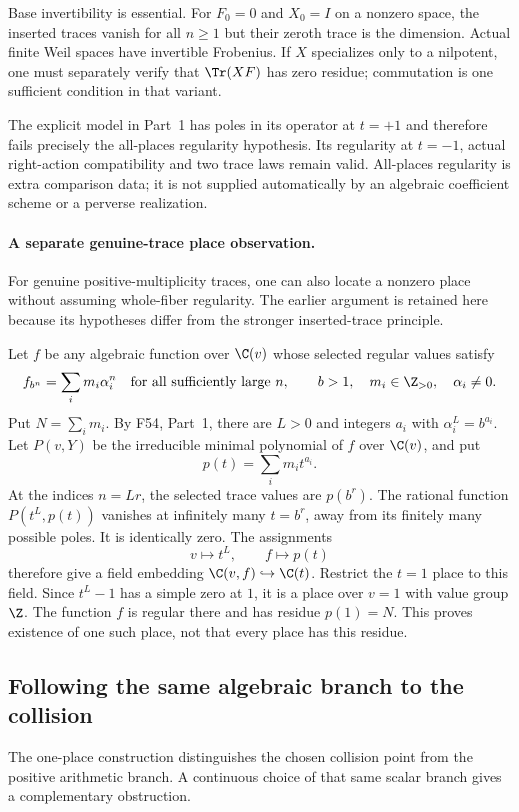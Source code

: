 \documentclass[11pt,a4paper]{article}
\newcommand{\fid}[1]{\textsf{#1}}\newcommand{\gate}[1]{\textsf{#1}}
\theoremstyle{named}\newtheorem{finding}{Finding}[section]
\theoremstyle{definition}\newtheorem{definition}[finding]{Definition}
\theoremstyle{remark}\newtheorem{remark}[finding]{Remark}
\begin{document}
Base invertibility is essential.
For $F_0=0$ and $X_0=I$ on a nonzero space,
the inserted traces vanish for all $n\ge1$ but their
zeroth trace is the dimension.
Actual finite Weil spaces have invertible Frobenius.
If $X$ specializes only to a nilpotent, one must
separately verify that $\Tr(XF)$ has zero residue;
commutation is one sufficient condition in that variant.

The explicit model in Part~1 has poles in its operator
at $t=+1$ and therefore fails precisely the all-places
regularity hypothesis.
Its regularity at $t=-1$, actual right-action
compatibility and two trace laws remain valid.
All-places regularity is extra comparison data;
it is not supplied automatically by an algebraic
coefficient scheme or a perverse realization.
\paragraph{A separate genuine-trace place observation.}
For genuine positive-multiplicity traces, one can also locate a nonzero place without assuming whole-fiber regularity. The earlier argument is retained here because its hypotheses differ from the stronger inserted-trace principle.

Let $f$ be any algebraic function over $\C(v)$
whose selected regular values satisfy
\[
 f_{b^n}=\sum_i m_i\alpha_i^n
 \quad\text{for all sufficiently large }n,\qquad
 b>1,\quad m_i\in\Z_{>0},\quad\alpha_i\ne0.
\]
Put $N=\sum_i m_i$.
By \fid{F54}, Part~1, there are $L>0$ and integers
$a_i$ with $\alpha_i^L=b^{a_i}$.
Let $P(v,Y)$ be the irreducible minimal polynomial of
$f$ over $\C(v)$, and put
\[
 p(t)=\sum_i m_i t^{a_i}.
\]
At the indices $n=Lr$, the selected trace values
are $p(b^r)$. The rational function $P(t^L,p(t))$
vanishes at infinitely many $t=b^r$, away from its
finitely many possible poles. It is identically zero.
The assignments
\[
 v\longmapsto t^L,\qquad f\longmapsto p(t)
\]
therefore give a field embedding
$\C(v,f)\hookrightarrow\C(t)$.
Restrict the $t=1$ place to this field.
Since $t^L-1$ has a simple zero at $1$, it is a place
over $v=1$ with value group $\Z$.
The function $f$ is regular there and has residue
$p(1)=N$.
This proves existence of one such place, not that
every place has this residue.



\subsection{Following the same algebraic branch to the collision}
The one-place construction distinguishes the chosen collision point
from the positive arithmetic branch. A continuous choice of that
same scalar branch gives a complementary obstruction.
\end{document}
